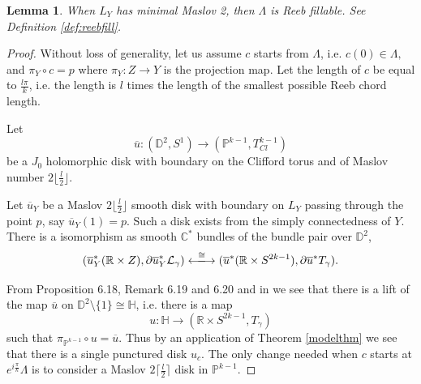 \documentclass[11pt, oneside,dvipsnames]{amsart}
\newcommand{\of}{\circ}
\renewcommand{\to}{\rightarrow}
\renewcommand{\to}{\rightarrow}
\newcommand{\<}{\langle}
\renewcommand{\>}{\rangle}
\newcommand{\bC}{\mathbb{C}}
\newcommand{\bD}{\mathbb{D}}
\newcommand{\bH}{\mathbb{H}}
\newcommand{\bP}{\mathbb{P}}
\newcommand{\bR}{\mathbb{R}}
\newcommand{\cL}{\mathcal{L}}
\newcommand{\sm}{\ensuremath{\setminus}}
\renewcommand{\to}{\rightarrow}
\newtheorem{lemma}[Theorem]{Lemma}
\theoremstyle{definition}
\theoremstyle{definition}
\numberwithin{equation}{subsection}
\begin{document}
\begin{lemma}\label{anypathhassinglepunct}
When $L_Y$ has minimal Maslov 2, then $\Lambda$ is Reeb fillable. See Definition \ref{def:reebfill}.
\end{lemma}


\begin{proof}

Without loss of generality, let us assume $c$ starts from $\Lambda$, i.e. $c(0) \in \Lambda,$ and $\pi_Y \of c = p$ where $\pi_Y : Z \to Y$ is the projection map. Let the length of $c$ be equal to $\frac{l\pi}{k}$, i.e. the length is $l$ times the length of the smallest possible Reeb chord length. 

    Let $$\overline{u}: (\bD^2,S^1) \to (\bP^{k-1}, T^{k-1}_{Cl})$$ be a $J_0$ holomorphic disk with boundary on the Clifford torus and of Maslov number $2\lfloor \frac{l}{2} \rfloor$.

    Let $\overline{u}_Y$ be a  Maslov $2\lfloor \frac{l}{2} \rfloor$ smooth disk with boundary on $L_Y$ passing through the point $p$, say $\overline{u}_Y (1)=p$. Such a disk exists from the simply connectedness of $Y$. There is a isomorphism as smooth $\bC^*$ bundles of the  bundle pair over $\bD^2$, $$(\overline{u}_Y^* (\bR \times Z), \partial \overline{u}_Y^* \cL_\gamma) \xlongleftrightarrow{\cong} (\overline{u}^* (\bR \times S^{2k-1}), \partial \overline{u}^* T_\gamma).$$

\noindent    From Proposition 6.18, Remark 6.19 and 6.20 and in \cite{Cha23} we see that there is a lift of the map $\overline{u}$ on  $\bD^2 \sm \{1 \} \cong \bH$, i.e. there is a map $$u: \bH \to (\bR \times S^{2k-1}, T_\gamma)$$ such that $\pi_{\bP^{k-1}} \of u = \overline{u}. $ Thus by an application of Theorem \ref{modelthm} we see that there is a single punctured disk $u_c$. 
\noindent  The only change needed when $c$ starts at $e^{i\frac{\pi}{k}}\Lambda$ is to consider a Maslov $2\lceil \frac{l}{2} \rceil$ disk in $\bP^{k-1}.$

\end{proof}

\end{document}
